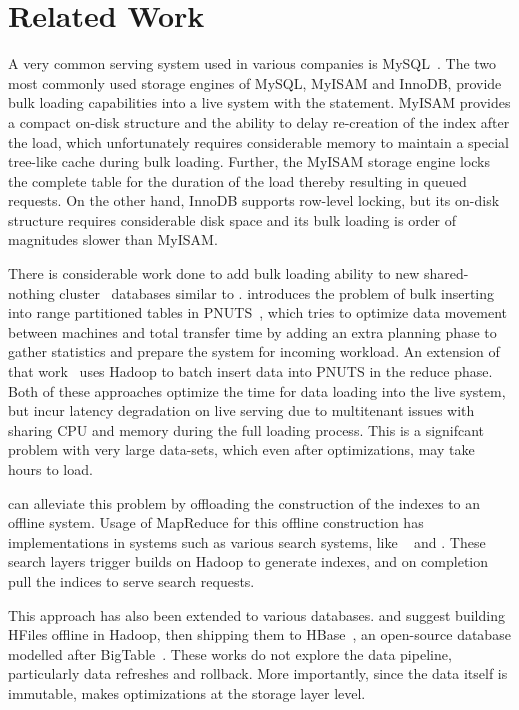 \section{Related Work}
\label{sec:related_work}

A very common serving system used in various companies is
MySQL~\cite{mysql}. The two most commonly used storage engines of
MySQL, MyISAM and InnoDB, provide bulk loading capabilities into a
live system with the  statement. MyISAM provides
a compact on-disk structure and the ability to delay re-creation of
the index after the load, which unfortunately requires considerable
memory to maintain a special tree-like cache during bulk loading.
Further, the MyISAM storage engine locks the complete table for the
duration of the load thereby resulting in queued requests. On the
other hand, InnoDB supports row-level locking, but its on-disk
structure requires considerable disk space and its bulk loading is
order of magnitudes slower than MyISAM. 

There is considerable work done to add bulk loading ability to new
shared-nothing cluster~\cite{sharednothing} databases similar to
\projectname{}. \citet{silberstein} introduces the problem of bulk
inserting into range partitioned tables in PNUTS~\cite{pnuts}, which
tries to optimize data movement between machines and total transfer
time by adding an extra planning phase to gather statistics and
prepare the system for incoming workload. An extension of that
work~\citet{pnutsbatch} uses Hadoop to batch insert data into PNUTS in
the reduce phase. Both of these approaches optimize the time for data
loading into the live system, but incur latency degradation on live
serving due to multitenant issues with sharing CPU and memory during
the full loading process. This is a signifcant problem with very large
data-sets, which even after optimizations, may take hours to load.  

\projectname{} can alleviate this problem by offloading the
construction of the indexes to an offline system. Usage of MapReduce
for this offline construction has implementations in systems such as
various search systems, like ~\citet{dean} and \citet{mika}.
These search layers trigger builds on Hadoop to generate indexes, and
on completion pull the indices to serve search requests. 

This approach has also been extended to various databases.
\citet{konstantinou} and \citet{barbuzzi} suggest building HFiles
offline in Hadoop, then shipping them to HBase~\cite{hbase}, an
open-source database modelled after BigTable~\cite{bigtable}. These
works do not explore the data pipeline, particularly data refreshes
and rollback. More importantly, since the data itself is immutable,
\projectname{} makes optimizations at the storage layer level.

